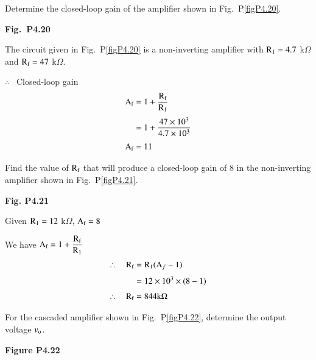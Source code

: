 \begin{problem}\label{prob4.20}
Determine the closed-loop gain of the amplifier shown in Fig.~P\ref{figP4.20}.
\begin{center}
{\bf Fig.~P4.20}
\end{center}
\end{problem}

\begin{solution}
The circuit given in Fig.~P\ref{figP4.20} is a non-inverting amplifier with $\textrm{R}_{1}=4.7$ k$\Omega$ and $\textrm{R}_{\textrm{f}}=47$ k$\Omega$.

$\therefore$~ Closed-loop gain
\begin{align*}
\textrm{A}_{\textrm{f}} &= 1+\frac{\textrm{R}_{\textrm{f}}}{\textrm{R}_{1}}\\[3pt]
&= 1+\frac{47\times 10^{3}}{4.7\times 10^{3}}\\[3pt]
\textrm{A}_{\textrm{f}} &= 11
\end{align*}
\end{solution}

\begin{problem}\label{prob4.21}
Find the value of $\textrm{R}_{\textrm{f}}$ that will produce a closed-loop gain of 8 in the non-inverting amplifier shown in Fig.~P\ref{figP4.21}.
\begin{center}
{\bf Fig. P4.21}
\end{center}
\end{problem}

\begin{solution}
Given $\textrm{R}_{1}=12$ k$\Omega$, $\textrm{A}_{\textrm{f}}=8$

\medskip
We have $\textrm{A}_{\textrm{f}}=1+\dfrac{\textrm{R}_{\textrm{f}}}{\textrm{R}_{1}}$
\begin{align*}
\therefore\quad \textrm{R}_{\textrm{f}} &= \textrm{R}_{1}(\textrm{A}_{f}-1)\\[3pt]
&= 12\times 10^{3}\times (8-1)\\[3pt]
\therefore\quad \textrm{R}_{\textrm{f}} &= 844 \textrm{k} \Omega
\end{align*}
\end{solution}

\begin{problem}\label{prob4.22}
For the cascaded amplifier shown in Fig.~P\ref{figP4.22}, determine the output voltage $v_{\textrm{o}}$.
\begin{center}
{\bf Figure P4.22}
\end{center}
\end{problem}

